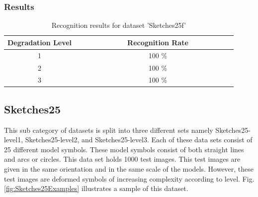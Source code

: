 \subsubsection{Results}
\begin{table}[h]
\centering
\caption{Recognition results for dataset 'Sketches25f'}
\begin{tabular}{ccccccccccccccc}
  \hline
      Degradation Level & & & & & & & & Recognition Rate \\
  \hline
     1 & & & & & & & &  100 \% \\
     2 & & & & & & & &  100 \% \\
     3 & & & & & & & &  100 \% \\
  \hline
\end{tabular}
\end{table}



\vspace{85mm}

\subsection{Sketches25}
This sub category of datasets is split into three different sets namely Sketches25-level1, Sketches25-level2, and Sketches25-level3. Each of these data sets consist of 25 different model symbols. These model symbols consist of both straight lines and arcs or circles. This data set holds 1000 test images. This test images are given in the same orientation and in the same scale of the models. However, these test images are deformed symbols of increasing complexity according to level. Fig.\ref{fig:Sketches25Examples} illustrates a sample of this dataset.


